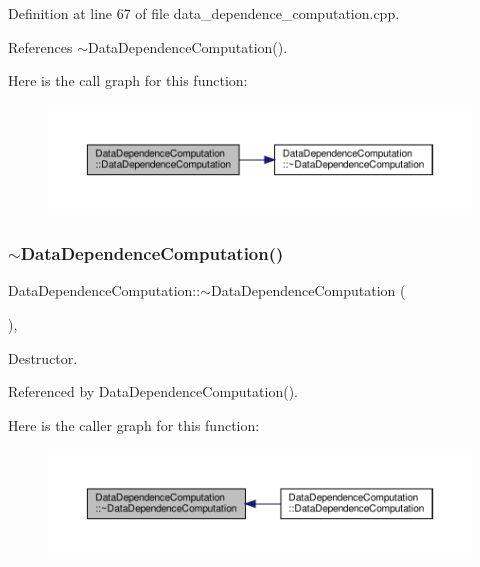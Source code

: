Definition at line 67 of file data\+\_\+dependence\+\_\+computation.\+cpp.



References $\sim$\+Data\+Dependence\+Computation().

Here is the call graph for this function\+:
\nopagebreak
\begin{figure}[H]
\begin{center}
\leavevmode
\includegraphics[width=350pt]{d3/dc0/classDataDependenceComputation_a286a5513c200ec9e73819d00b8629598_cgraph}
\end{center}
\end{figure}
\mbox{\label{classDataDependenceComputation_ae296f81ebc870952dac5cad0b1da27ad}} 
\subsubsection{\texorpdfstring{$\sim$\+Data\+Dependence\+Computation()}{~DataDependenceComputation()}}
{\footnotesize\ttfamily Data\+Dependence\+Computation\+::$\sim$\+Data\+Dependence\+Computation (\begin{DoxyParamCaption}{ }\end{DoxyParamCaption})\hspace{0.3cm}{\ttfamily [override]}, {\ttfamily [default]}}



Destructor. 



Referenced by Data\+Dependence\+Computation().

Here is the caller graph for this function\+:
\nopagebreak
\begin{figure}[H]
\begin{center}
\leavevmode
\includegraphics[width=350pt]{d3/dc0/classDataDependenceComputation_ae296f81ebc870952dac5cad0b1da27ad_icgraph}
\end{center}
\end{figure}


